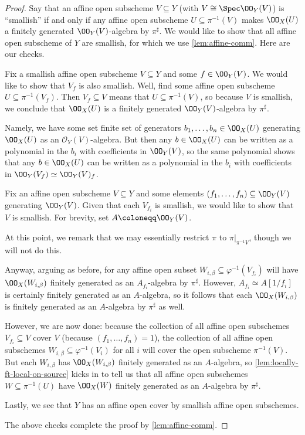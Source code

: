 \documentclass[../notes.tex]{subfiles}
\begin{document}
\begin{proof}
	Say that an affine open subscheme $V\subseteq Y$ (with $V\cong\Spec\OO_Y(V)$) is ``smallish'' if and only if any affine open subscheme $U\subseteq\pi^{-1}(V)$ makes $\OO_X(U)$ a finitely generated $\OO_Y(V)$-algebra by $\pi^\sharp$. We would like to show that all affine open subscheme of $Y$ are smallish, for which we use \autoref{lem:affine-comm}. Here are our checks.
	\begin{listroman}
		\item Fix a smallish affine open subscheme $V\subseteq Y$ and some $f\in\OO_Y(V)$. We would like to show that $V_f$ is also smallish. Well, find some affine open subscheme $U\subseteq\pi^{-1}(V_f)$. Then $V_f\subseteq V$ means that $U\subseteq\pi^{-1}(V)$, so because $V$ is smallish, we conclude that $\OO_X(U)$ is a finitely generated $\OO_Y(V)$-algebra by $\pi^\sharp$.

		Namely, we have some set finite set of generators $b_1,\ldots,b_n\in\OO_X(U)$ generating $\OO_X(U)$ as an $\mathcal O_Y(V)$-algebra. But then any $b\in\OO_X(U)$ can be written as a polynomial in the $b_i$ with coefficients in $\OO_Y(V)$, so the same polynomial shows that any $b\in\OO_X(U)$ can be written as a polynomial in the $b_i$ with coefficients in $\OO_Y(V_f)\simeq\OO_Y(V)_f$.
		\item Fix an affine open subscheme $V\subseteq Y$ and some elements $(f_1,\ldots,f_n)\subseteq\OO_Y(V)$ generating $\OO_Y(V)$. Given that each $V_{f_i}$ is smallish, we would like to show that $V$ is smallish. For brevity, set $A\coloneqq\OO_Y(V)$.

		At this point, we remark that we may essentially restrict $\pi$ to $\pi|_{\pi^{-1}V}$, though we will not do this.

		Anyway, arguing as before, for any affine open subset $W_{i,\beta}\subseteq\varphi^{-1}(V_{f_i})$ will have $\OO_X(W_{i,\beta})$ finitely generated as an $A_{f_i}$-algebra by $\pi^\sharp$. However, $A_{f_i}\simeq A[1/f_i]$ is certainly finitely generated as an $A$-algebra, so it follows that each $\OO_X(W_{i,\beta})$ is finitely generated as an $A$-algebra by $\pi^\sharp$ as well.

		However, we are now done: because the collection of all affine open subschemes $V_{f_i}\subseteq V$ cover $V$ (because $(f_1,\ldots,f_n)=1$), the collection of all affine open subschemes $W_{i,\beta}\subseteq\varphi^{-1}(V_i)$ for all $i$ will cover the open subscheme $\pi^{-1}(V)$. But each $W_{i,\beta}$ has $\OO_X(W_{i,\beta})$ finitely generated as an $A$-algebra, so \autoref{lem:locally-ft-local-on-source} kicks in to tell us that all affine open subschemes $W\subseteq\pi^{-1}(U)$ have $\OO_X(W)$ finitely generated as an $A$-algebra by $\pi^\sharp$.
		\item Lastly, we see that $Y$ has an affine open cover by smallish affine open subschemes.
	\end{listroman}
	The above checks complete the proof by \autoref{lem:affine-comm}.
\end{proof}
\end{document}
